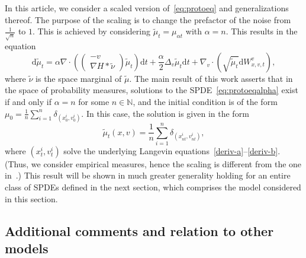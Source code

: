 \documentclass{article}
\newcommand{\dd}{\text{d}}
\newcommand{\N}{\mathbb{N}}
\begin{document}
In this article, we consider a scaled version of~\eqref{eq:protoeq} and generalizations thereof. The purpose
of the scaling is to change the prefactor of the noise from $\frac 1 {\sqrt{n}}$ to $1$.  This is achieved by
considering $\tilde \mu_t = \mu_{\alpha t}$ with $\alpha=n$. This results in the equation
\begin{equation}  
\label{eq:protoeqalpha}
  \dd \tilde\mu_t = \alpha \nabla \cdot \left( \begin{pmatrix} -v \\  \nabla H \ast \tilde\nu \end{pmatrix} \tilde\mu_t\right) \dd t
  + \frac \alpha 2  \Delta_{v} \tilde\mu_t \dd t+ \nabla_v \cdot\left(\sqrt{\tilde\mu_t}\dd W_{x,v,t}^v\right),
\end{equation}
where $\tilde \nu$ is the space marginal of $\tilde\mu$.  The main result of this work asserts that in the
space of probability measures, solutions to the SPDE~\eqref{eq:protoeqalpha} exist if and only if $\alpha =n$
for some $n \in \N$, and the initial condition is of the form
$\mu_0 = \frac 1 n \sum_{i=1}^n \delta_{(x_0^i, v_0^i)}$. In this case, the solution is given in the form
\begin{equation*}
    \tilde \mu_t(x,v) = \frac 1 n \sum_{i=1}^n \delta_{(x_{n t}^i, v_{nt}^i)},
\end{equation*}
where $(x_t^i,v_t^i)$ solve the underlying Langevin equations~\eqref{deriv-a}--\eqref{deriv-b}.  (Thus, we
consider empirical measures, hence the scaling is different from the one in~\cite{Dean1996a}.) This result
will be shown in much greater generality holding for an entire class of SPDEs defined in the next section,
which comprises the model considered in this section.


\subsection{Additional comments and relation to other models}
\end{document}
